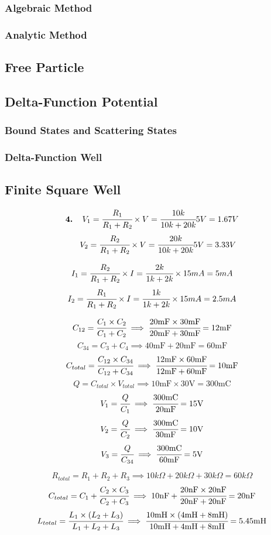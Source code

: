 \documentclass{article}
\renewcommand{\bf}[1]{\textbf{#1}}
\begin{document}
\subsubsection{Algebraic Method}

\subsubsection{Analytic Method}
\subsection{Free Particle}
\subsection{Delta-Function Potential}
\subsubsection{Bound States and Scattering States}
\subsubsection{Delta-Function Well}
\subsection{Finite Square Well}
$$ \bf{4.}\,\,\,\,\,\,\, V_1 = \cfrac{R_1}{R_1+R_2}\times V = \cfrac{10k}{10k+20k}5V = 1.67V$$
$$ \,\,\,\,\,\,\,\,\, V_2 = \cfrac{R_2}{R_1+R_2}\times V = \cfrac{20k}{10k+20k}5V = 3.33V$$

$$I_1 = \cfrac{R_2}{R_1+R_2}\times I = \cfrac{2k}{1k+2k}\times 15mA = 5mA$$
$$I_2 = \cfrac{R_1}{R_1+R_2}\times I = \cfrac{1k}{1k+2k}\times 15mA = 2.5mA$$

$$ C_{12} = \cfrac{C_1 \times C_2}{C_1+C_2} \implies \cfrac{20\text{mF}  \times 30\text{mF}}{20\text{mF}+30\text{mF}} = 12 \text{mF} $$
$$ C_{34} = C_3 + C_4 \implies 40 \text{mF} + 20 \text{mF} = 60 \text{mF} $$
$$ C_{total} = \cfrac{C_{12} \times C_{34}}{C_{12}+C_{34}} \implies \cfrac{12 \text{mF}\times 60\text{mF}}{12\text{mF}+60\text{mF}} = 10 \text{mF}$$
$$ Q = C_{total} \times V_{total} \implies 10\text{mF} \times 30 \text{V} = 300 \text{mC}$$
$$V_1 = \cfrac{Q}{C_1} \implies \cfrac{300 \text{mC}}{20\text{mF}} = 15\text{V} $$
$$V_2 = \cfrac{Q}{C_2} \implies \cfrac{300 \text{mC}}{30\text{mF}} = 10\text{V} $$
$$V_3 = \cfrac{Q}{C_{34}} \implies \cfrac{300 \text{mC}}{60\text{mF}} = 5\text{V} $$


$$    R_{total} = R_1+R_2+R_3 \implies 10k \Omega + 20k \Omega + 30k \Omega = 60k \Omega$$
$$   C_{total} = C_1+\cfrac{C_2\times C_3}{C_2+C_3} \implies 10 \text{nF}+ \cfrac{20\text{nF}\times 20\text{nF}}{20\text{nF}+20\text{nF}} = 20\text{nF}$$
$$    L_{total} = \cfrac{L_1\times(L_2+L_3)}{L_1+L_2+L_3} \implies \cfrac{10\text{mH}\times(4\text{mH}+8\text{mH})}{10\text{mH}+4\text{mH}+8\text{mH}} = 5.45 \text{mH}$$
\end{document}
